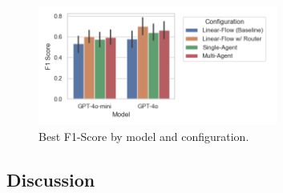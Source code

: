         \begin{figure}[h]
            \centering
            \includegraphics[width=0.7\textwidth]{images_exp2/bar_best_f1_by_model_and_configuration.png}
            \caption{Best F1-Score by model and configuration.}
            \label{fig:best_f1_by_model_and_configuration}
        \end{figure}



    \subsection{Discussion}

















